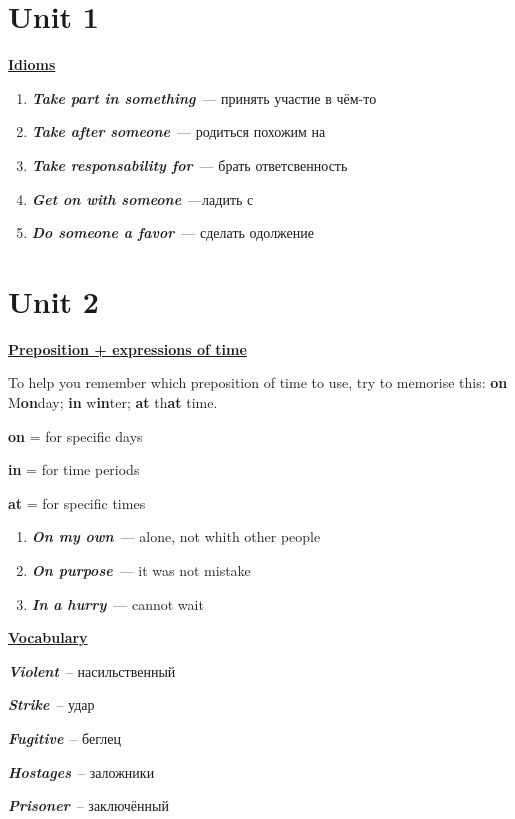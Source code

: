 \documentclass[10pt,a4paper]{article}
\newcommand\ex[1]{\textit{\textbf{{#1}}}}
\begin{document}
\twocolumn[]


\section{Unit 1}
\textbf{\underline{Idioms}}

\begin{enumerate}
  \item \ex{Take part in something}~--- принять участие в чём-то
  \item \ex{Take after someone}~--- родиться похожим на
  \item \ex{Take responsability for}~--- брать ответсвенность
  \item \ex{Get on with someone}~---ладить с
  \item \ex{Do someone a favor}~--- сделать одолжение
\end{enumerate}




\section{Unit 2}

\textbf{\underline{Preposition + expressions of time}}

To help you remember which preposition of time to use, try to memorise this: \textbf{on} M\textbf{on}day; \textbf{in} w\textbf{in}ter; \textbf{at} th\textbf{at} time. 

\textbf{on} = for specific days

\textbf{in} = for time periods

\textbf{at} = for specific times

\begin{enumerate}
  \item \ex{On my own}~--- alone, not whith other people
  \item \ex{On purpose}~--- it was not mistake
  \item \ex{In a hurry}~--- cannot wait
\end{enumerate}

\textbf{\underline{Vocabulary}}

\ex{Violent}~-- насильственный

\ex{Strike}~-- удар

\ex{Fugitive}~-- беглец

\ex{Hostages}~-- заложники

\ex{Prisoner}~-- заключённый
\end{document}
